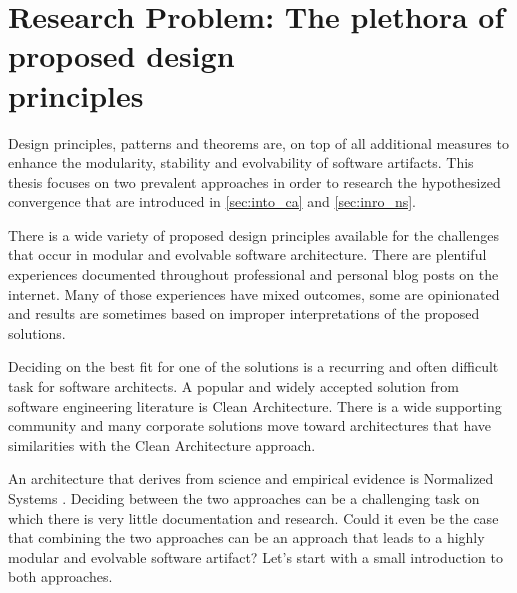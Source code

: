 \section{Research Problem: The plethora of proposed design \\ principles}
\label{sec:research_problem}

Design principles, patterns and theorems are, on top of all additional measures to enhance
the modularity, stability and evolvability of software artifacts. This thesis focuses on
two prevalent approaches in order to research the hypothesized convergence that are
introduced in \ref{sec:into_ca} and \ref{sec:inro_ns}. 

There is a wide variety of proposed design principles available for the challenges that
occur in modular and evolvable software architecture. There are plentiful experiences
documented throughout professional and personal blog posts on the internet. Many of those
experiences have mixed outcomes, some are opinionated and results are sometimes based on
improper interpretations of the proposed solutions.

Deciding on the best fit for one of the solutions is a recurring and often difficult task
for software architects. A popular and widely accepted solution from software engineering
literature is Clean Architecture. There is a wide supporting community and many corporate
solutions move toward architectures that have similarities with the Clean Architecture
approach. 

An architecture that derives from science and empirical evidence is Normalized Systems
\parencite{mannaert_normalized_2009,mannaert_normalized_2016}. Deciding between the two
approaches can be a challenging task on which there is very little documentation and
research. Could it even be the case that combining the two approaches can be an approach
that leads to a highly modular and evolvable software artifact? Let's start with a small
introduction to both approaches.